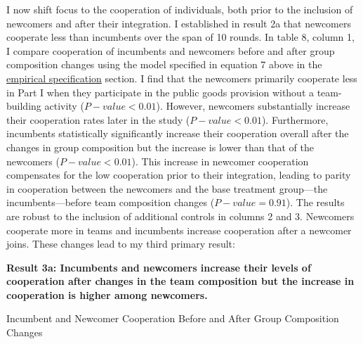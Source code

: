 \hspace  *{0mm} I now shift focus to the cooperation of individuals, both prior to the inclusion of newcomers and after their integration. I established in result 2a that newcomers cooperate less than incumbents over the span of 10 rounds. In table 8, column 1, I compare cooperation of incumbents and newcomers before and after group composition changes using the model specified in equation 7 above in the \hyperref[subsec:Specification]{empirical specification} section. I find that the newcomers primarily cooperate less in Part I when they participate in the public goods provision without a team-building activity ($P-value<0.01$). However, newcomers substantially increase their cooperation rates later in the study ($P-value<0.01$). Furthermore, incumbents statistically significantly increase their cooperation overall after the changes in group composition but the increase is lower than that of the newcomers ($P-value<0.01$). This increase in newcomer cooperation compensates for the low cooperation prior to their integration, leading to parity in cooperation between the newcomers and the base treatment group---the incumbents---before team composition changes ($P-value=0.91$). The results are robust to the inclusion of additional controls in columns 2 and 3. Newcomers cooperate more in teams and incumbents increase cooperation after a newcomer joins. These changes lead to my third primary result: 

\textbf{Result 3a: Incumbents and newcomers increase their levels of cooperation after changes in the team composition but the increase in cooperation is higher among newcomers.}

\begin{table}[H]
 \captionsetup{justification=raggedright,singlelinecheck=false}
\caption{Incumbent and Newcomer Cooperation Before and After Group Composition Changes} \label{tab:table5}
    \begin{center}
        
    \end{center}
\end{table}




